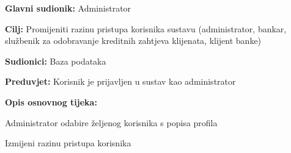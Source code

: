 							
			
			\noindent {}
			\begin{packed_item}
				
				\item \textbf{Glavni sudionik: }Administrator
				\item  \textbf{Cilj:} Promijeniti razinu pristupa korisnika sustavu (administrator, bankar, službenik za odobravanje kreditnih zahtjeva klijenata, klijent banke)
				\item  \textbf{Sudionici:} Baza podataka
				\item  \textbf{Preduvjet:} Korisnik je prijavljen u sustav kao administrator
				\item  \textbf{Opis osnovnog tijeka:}
				
				\item[] \begin{packed_enum}
					
					\item Administrator odabire željenog korisnika s popisa profila
					\item Izmijeni razinu pristupa korisnika
					
					
				\end{packed_enum}
				
			\end{packed_item}
			
